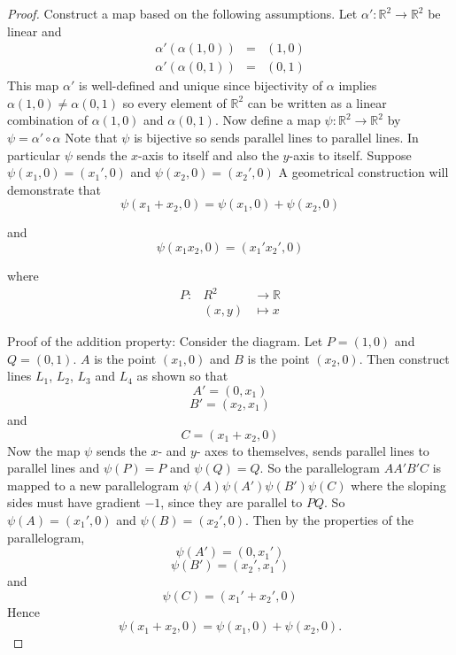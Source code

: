 \documentclass[honours]{UNSWthesis}
\newcommand{\R}{\mathbb{R}}
\newcommand{\1}{\mathbf{e}_{1}}
\newcommand{\2}{\mathbf{e}_{3}}
\newcommand{\3}{\mathbf{e}_{3}}
\begin{document}
\begin{proof}
Construct a map based on the following assumptions. Let $\alpha': \R^{2} \longrightarrow \R^{2}$ be linear and
\begin{eqnarray*}
\alpha'(\alpha(1,0))&=& (1,0)\\
\alpha'(\alpha(0,1)) &=& (0,1)
\end{eqnarray*}
This map $\alpha'$ is well-defined and unique since bijectivity of $\alpha$ implies $\alpha(1,0) \neq \alpha(0,1)$ so every element of $\R^{2}$ can be written as a linear combination of $\alpha(1,0)$ and $\alpha(0,1)$. 
Now define a map $\psi: \R^{2} \longrightarrow \R^{2}$ by $\psi= \alpha' \circ \alpha$
Note that $\psi$ is bijective so sends parallel lines to parallel lines. In particular $\psi$ sends the $x$-axis to itself and also the $y$-axis to itself. Suppose $\psi(x_{1},0)=(x_{1}',0)$ and $\psi(x_{2},0)=(x_{2}',0)$
A geometrical construction will demonstrate that
\begin{equation}
\psi(x_{1}+x_{2},0)=\psi(x_{1},0)+\psi(x_{2},0)
\end{equation}

and 
\begin{equation}
\psi(x_{1}x_{2},0)=(x_{1}'x_{2}',0)
\end{equation}


where 
\begin{eqnarray*}
P: &R^{2}& \longrightarrow \R \\
&(x,y)& \longmapsto x
\end{eqnarray*}

Proof of the addition property:
Consider the diagram. Let $P=(1,0)$ and $Q=(0,1)$. $A$ is the point $(x_{1},0)$ and $B$ is the point $(x_{2},0)$. Then construct lines $L_{1}$, $L_{2}$, $L_{3}$ and $L_{4}$ as shown so that $$A'=(0,x_{1})$$ $$B'=(x_{2}, x_{1})$$ and $$C=(x_{1}+x_{2},0)$$ Now the map $\psi$ sends the $x$- and $y$- axes to themselves, sends parallel lines to parallel lines and $\psi(P)=P$ and $\psi(Q)=Q$. So the parallelogram $AA'B'C$ is mapped to a new parallelogram $\psi(A)\psi(A')\psi(B')\psi(C)$ where the sloping sides must have gradient $-1$, since they are parallel to $PQ$. So $\psi(A)=(x_{1}',0)$ and $\psi(B)=(x_{2}',0)$. Then by the properties of the parallelogram, 
\[
\psi(A')=(0,x_{1}')
\]
\[
\psi(B')=(x_{2}',x_{1}')
\]
and 
\[
\psi(C)=(x_{1}'+x_{2}',0)
\]
Hence 
\begin{equation}\label{axisaddnmap}
\psi(x_{1}+x_{2},0)=\psi(x_{1},0)+\psi(x_{2},0). 
\end{equation}


\end{proof}
\end{document}

